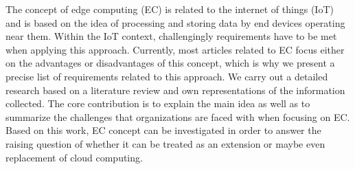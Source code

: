 The concept of edge computing (EC) is related to the internet of things (IoT) and is based on the idea of processing and storing data by end devices operating near them. Within the IoT context, challengingly requirements have to be met when applying this approach. Currently, most articles related to EC focus either on the advantages or disadvantages of this concept, which is why we present a precise list of requirements related to this approach. We carry out a detailed research based on a literature review and own representations of the information collected. The core contribution is to explain the main idea as well as to summarize the challenges that organizations are faced with when focusing on EC. Based on this work, EC concept can be investigated in order to answer the raising question of whether it can be treated as an extension or maybe even replacement of cloud computing.